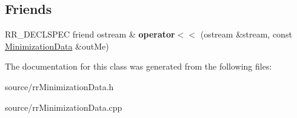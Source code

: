 \subsection*{Friends}
\begin{DoxyCompactItemize}
\item 
\hypertarget{classrr_1_1_minimization_data_aad867c190567cbaa2a1b98203d1b398b}{R\-R\-\_\-\-D\-E\-C\-L\-S\-P\-E\-C friend ostream \& {\bfseries operator$<$$<$} (ostream \&stream, const \hyperlink{classrr_1_1_minimization_data}{Minimization\-Data} \&out\-Me)}\label{classrr_1_1_minimization_data_aad867c190567cbaa2a1b98203d1b398b}

\end{DoxyCompactItemize}


The documentation for this class was generated from the following files\-:\begin{DoxyCompactItemize}
\item 
source/rr\-Minimization\-Data.\-h\item 
source/rr\-Minimization\-Data.\-cpp\end{DoxyCompactItemize}
